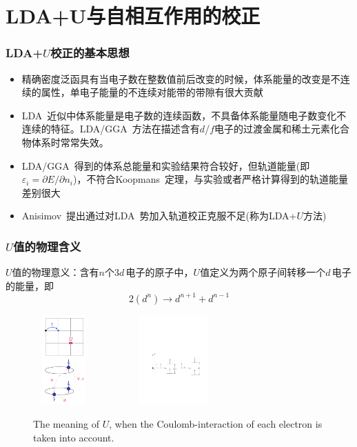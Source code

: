 \section{LDA+U与自相互作用的校正}
\frame
{
\frametitle{LDA+$U$校正的基本思想}
\begin{itemize}
\setlength{\itemsep}{10pt}
	\item 精确密度泛函具有当电子数在整数值前后改变的时候，体系能量的改变是不连续的属性，单电子能量的不连续对能带的带隙有很大贡献
	 \item\textrm{LDA~}近似中体系能量是电子数的连续函数，不具备体系能量随电子数变化不连续的特征。\textrm{LDA/GGA~}方法在描述含有$d$/$f$电子的过渡金属和稀土元素化合物体系时常常失效。
	\item \textrm{LDA}/\textrm{GGA~}得到的体系总能量和实验结果符合较好，但轨道能量(即$\varepsilon_i=\partial E/\partial n_i$)，不符合\textrm{Koopmans~}定理，与实验或者严格计算得到的轨道能量差别很大%
	\item \textrm{Anisimov~}提出通过对\textrm{LDA~}势加入轨道校正克服不足(称为\textrm{LDA+$U$}方法)%
\end{itemize}
}
\frame
{
\frametitle{$U$值的物理含义}
\textrm{$U$}值的物理意义：含有$n$个3$d$\,电子的原子中，\textrm{$U$}值定义为两个原子间转移一个$d$\,电子的能量，即$$2(d^n)\rightarrow d^{n+1}+d^{n-1}$$
\begin{figure}[h!]
\centering
\includegraphics[height=1.35in,width=0.92in,viewport=1 1 240 375,clip]{Figures/LDA_U-1.png}
\includegraphics[height=1.35in,width=2.32in,viewport=110 210 545 455,clip]{Figures/LDA_U.pdf}
\caption{\small \textrm{The meaning of $U$, when the Coulomb-interaction of each electron is taken into account.}}%
\label{Tetrahedron_weight}
\end{figure}
}

